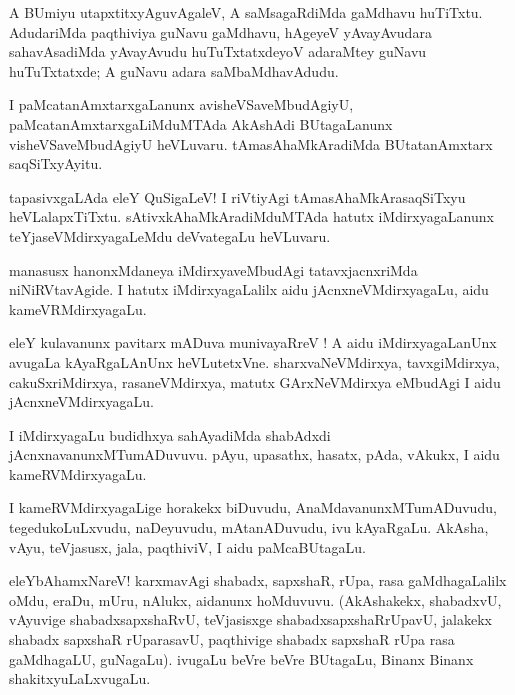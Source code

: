 \documentclass{article}
\begin{document}
\begin{mn}
A BUmiyu utapxtitxyAguvAgaleV, A saMsagaRdiMda gaMdhavu huTiTxtu. 
AdudariMda paqthiviya guNavu gaMdhavu, hAgeyeV yAvayAvudara 
sahavAsadiMda yAvayAvudu huTuTxtatxdeyoV adaraMtey guNavu huTuTxtatxde; 
A guNavu adara saMbaMdhavAdudu.
\end{mn}

\begin{mn}
I paMcatanAmxtarxgaLanunx avisheVSaveMbudAgiyU, 
paMcatanAmxtarxgaLiMduMTAda AkAshAdi BUtagaLanunx visheVSaveMbudAgiyU heVLuvaru. 
tAmasAhaMkAradiMda BUtatanAmxtarx saqSiTxyAyitu.
\end{mn}

\begin{mn}
tapasivxgaLAda eleY QuSigaLeV! I riVtiyAgi tAmasAhaMkArasaqSiTxyu heVLalapxTiTxtu.
sAtivxkAhaMkAradiMduMTAda hatutx iMdirxyagaLanunx teYjaseVMdirxyagaLeMdu deVvategaLu heVLuvaru.
\end{mn}

\begin{mn}
manasusx hanonxMdaneya iMdirxyaveMbudAgi tatavxjacnxriMda niNiRVtavAgide. 
I hatutx iMdirxyagaLalilx aidu jAcnxneVMdirxyagaLu, aidu kameVRMdirxyagaLu. 
\end{mn}

\begin{mn}
eleY kulavanunx pavitarx mADuva munivayaRreV ! A aidu iMdirxyagaLanUnx 
avugaLa kAyaRgaLAnUnx heVLutetxVne. sharxvaNeVMdirxya, tavxgiMdirxya, cakuSxriMdirxya,
rasaneVMdirxya, matutx GArxNeVMdirxya eMbudAgi I aidu jAcnxneVMdirxyagaLu.
\end{mn}

\begin{mn}
I iMdirxyagaLu budidhxya sahAyadiMda shabAdxdi jAcnxnavanunxMTumADuvuvu. 
pAyu, upasathx, hasatx, pAda, vAkukx, I aidu kameRVMdirxyagaLu.
\end{mn}

\begin{mn}
I kameRVMdirxyagaLige horakekx biDuvudu, AnaMdavanunxMTumADuvudu, tegedukoLuLxvudu, 
naDeyuvudu, mAtanADuvudu, ivu kAyaRgaLu. AkAsha, vAyu, teVjasusx, jala, 
paqthiviV,  I aidu paMcaBUtagaLu.
\end{mn}

\begin{mn}
eleYbAhamxNareV! karxmavAgi shabadx, sapxshaR, rUpa, rasa gaMdhagaLalilx oMdu, eraDu,
mUru, nAlukx, aidanunx hoMduvuvu. (AkAshakekx, shabadxvU, vAyuvige shabadxsapxshaRvU,
teVjasisxge shabadxsapxshaRrUpavU, jalakekx shabadx sapxshaR rUparasavU, paqthivige shabadx 
sapxshaR rUpa rasa gaMdhagaLU, guNagaLu). ivugaLu beVre beVre BUtagaLu, 
Binanx Binanx shakitxyuLaLxvugaLu.
\end{mn}
\end{document}
